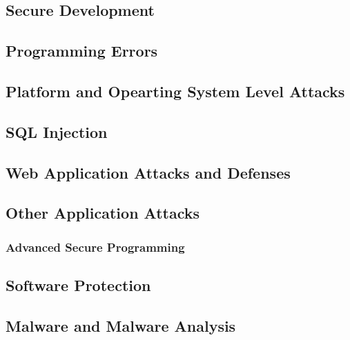 \documentclass[9pt]{extarticle}
\begin{document}
  \begin{multicols}{2}
  \subsection*{Secure Development}
  

  \subsection*{Programming Errors}
  

  \subsection*{Platform and Opearting System Level Attacks}
  

  \subsection*{SQL Injection}
  

  \subsection*{Web Application Attacks and Defenses}
  

  \subsection*{Other Application Attacks}
  

  \subsubsection*{Advanced Secure Programming}
  

  \subsection*{Software Protection}
  

  \subsection*{Malware and Malware Analysis}
  
  \end{multicols}
\end{document}
